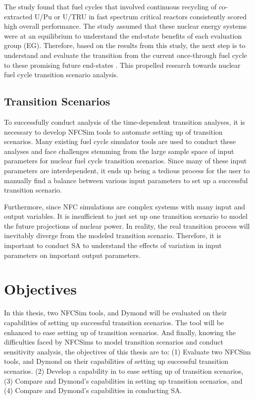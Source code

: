 The study found that fuel cycles that involved continuous recycling
of co-extracted U/Pu or U/TRU in fast spectrum critical reactors
consistently scored high overall performance. 
The study assumed that 
these nuclear energy systems were at an equilibrium to understand 
the end-state benefits of each evaluation group (EG). 
Therefore, based on the results from this study, the next step is 
to understand and evaluate the transition from the current 
once-through fuel cycle to these promising 
future end-states \cite{feng_standardized_2016}. 
This propelled research towards nuclear fuel cycle transition 
scenario analysis. 

\subsection{Transition Scenarios}
To successfully conduct analysis of the time-dependent transition
analyses, it is necessary to develop \gls{NFCSim} tools to  
automate setting up of transition scenarios. 
Many existing fuel cycle simulator tools are used to conduct 
these analyses and face challenges stemming from the large sample 
space of input 
parameters for nuclear fuel cycle transition scenarios.
Since many of these input parameters are interdependent, it ends
up being a tedious process for the user to manually find a balance 
between various input parameters to set up a successful transition 
scenario. 

Furthermore, since \gls{NFC} simulations are complex systems with 
many input and output variables. 
It is insufficient to just set up one transition scenario to model 
the future projections of nuclear power. 
In reality, the real transition process will 
inevitably diverge from the modeled transition scenario. 
Therefore, it is important to conduct \gls{SA} to understand 
the effects of variation in input parameters on 
important output parameters. 

\section{Objectives}
In this thesis, two \gls{NFCSim} tools, \Cyclus and 
Dymond will be evaluated on their capabilities of setting up 
successful transition scenarios. 
The \Cyclus tool will be enhanced to ease setting up of 
transition scenarios. 
And finally,   
knowing the difficulties faced by \glspl{NFCSim} to model 
transition scenarios and conduct sensitivity analysis, 
the objectives of this thesis are to: 
(1) Evaluate two \gls{NFCSim} tools, \Cyclus and 
Dymond on their capabilities of setting up 
successful transition scenarios. 
(2) Develop a capability in \Cyclus to ease setting up of transition 
scenarios, 
(3) Compare \Cyclus and Dymond's capabilities in setting up 
transition scenarios, and 
(4) Compare \Cyclus and Dymond's capabilities in conducting \gls{SA}. 